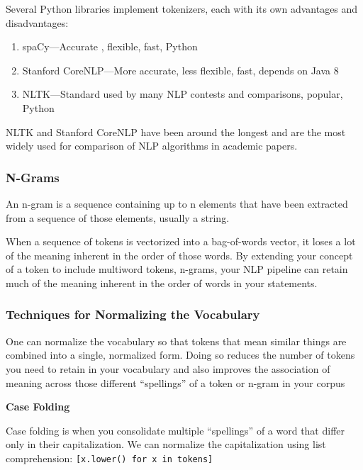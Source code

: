 \documentclass[
]{book}
\begin{document}
Several Python libraries implement tokenizers, each with its own advantages and disadvantages:

\begin{enumerate}
\def\labelenumi{\arabic{enumi}.}
\item
  spaCy---Accurate , flexible, fast, Python
\item
  Stanford CoreNLP---More accurate, less flexible, fast, depends on Java 8
\item
  NLTK---Standard used by many NLP contests and comparisons, popular, Python
\end{enumerate}

NLTK and Stanford CoreNLP have been around the longest and are the most widely used for comparison of NLP algorithms in academic papers.

\hypertarget{n-grams}{%
\subsubsection{N-Grams}\label{n-grams}}

An n-gram is a sequence containing up to n elements that have been extracted from a sequence of those elements, usually a string.

When a sequence of tokens is vectorized into a bag-of-words vector, it loses a lot of the meaning inherent in the order of those words. By extending your concept of a token to include multiword tokens, n-grams, your NLP pipeline can retain much of the meaning inherent in the order of words in your statements.

\hypertarget{techniques-for-normalizing-the-vocabulary}{%
\subsubsection{Techniques for Normalizing the Vocabulary}\label{techniques-for-normalizing-the-vocabulary}}

One can normalize the vocabulary so that tokens that mean similar things are combined into a single, normalized form. Doing so reduces the number of tokens you need to retain in your vocabulary and also improves the association of meaning across those different ``spellings'' of a token or n-gram in your corpus

\textbf{Case Folding}

Case folding is when you consolidate multiple ``spellings'' of a word that differ only in their capitalization. We can normalize the capitalization using list comprehension: \texttt{{[}x.lower()\ for\ x\ in\ tokens{]}}
\end{document}
